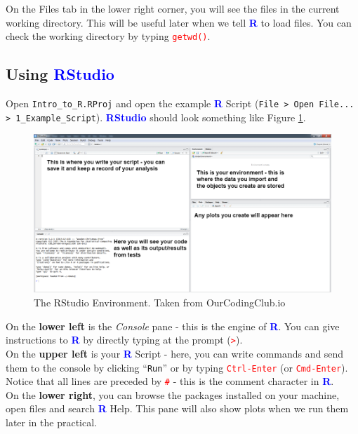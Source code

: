 \documentclass[a4paper,12pt]{article}
\newcommand\boldblue[1]{\textcolor{blue}{\textbf{#1}}}
\newcommand\code[1]{\textcolor{red}{\texttt{#1}}}
\begin{document}
On the Files tab in the lower right corner, you will see the files in the current working directory. This will be useful later when we tell \boldblue{R} to load files. You can check the working directory by typing \code{getwd()}.



\subsection {Using \boldblue{RStudio}}

Open \texttt{Intro\_to\_R.RProj} and open the example \boldblue{R} Script (\texttt{File > Open File... > 1\_Example\_Script}). \boldblue{RStudio} should look something like Figure \ref{fig:R_Studio}. 
\\

\begin{figure}[h]
	\centering 
	\includegraphics[width=1.1\textwidth]{figs/R_Studio.png}
	\caption{The RStudio Environment. Taken from OurCodingClub.io}
	\label{fig:R_Studio}
\end{figure} 

On the \textbf{lower left} is the \textit{Console} pane - this is the engine of \boldblue{R}. You can give instructions to \boldblue{R} by directly typing at the prompt (\code{>}). \\

On the \textbf{upper left} is your \boldblue{R} Script - here, you can write commands and send them to the console by clicking ``\texttt{Run}'' or by typing \code{Ctrl-Enter} (or \code{Cmd-Enter}). Notice that all lines are preceded by \code{\#} - this is the comment character in \boldblue{R}. \\

On the \textbf{lower right}, you can browse the packages installed on your machine, open files and search \boldblue{R} Help. This pane will also show plots when we run them later in the practical.
\\
\end{document}
